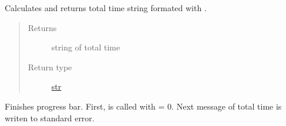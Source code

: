 \documentclass[a4paper,10pt,english]{sphinxmanual}
\begin{document}
\begin{fulllineitems}
\begin{fulllineitems}
\end{fulllineitems}


\begin{fulllineitems}
\label{aqueduct.utils.log:aqueduct.utils.log.SimpleProgressBar.ttime}
Calculates and returns total time string formated with {\hyperref[aqueduct.utils.log:aqueduct.utils.log.smart_time_string]{}}.
\begin{quote}\begin{description}
\item[{Returns}] \leavevmode
string of total time

\item[{Return type}] \leavevmode
\href{http://docs.python.org/2/library/functions.html\#str}{str}

\end{description}\end{quote}

\end{fulllineitems}


\begin{fulllineitems}
\label{aqueduct.utils.log:aqueduct.utils.log.SimpleProgressBar.finish}
Finishes progress bar. First, {\hyperref[aqueduct.utils.log:aqueduct.utils.log.SimpleProgressBar.update]{}} is called with  = 0. Next message of total time
is writen to standard error.

\end{fulllineitems}


\end{fulllineitems}

\end{document}
